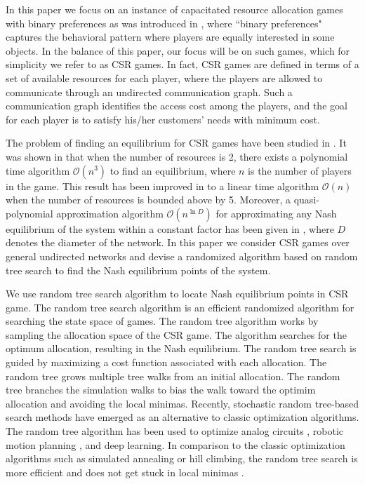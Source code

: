 In this paper we focus on an instance of capacitated resource allocation games with binary preferences as was introduced in \cite{gopalakrishnan2012cache}, where ``binary preferences" captures the behavioral pattern where players are equally interested in some objects. In the balance of this paper, our focus will be on such games, which for simplicity we refer to as CSR games. In fact, CSR games are defined in terms of a set of available resources for each player, where the players are allowed to communicate through an undirected communication graph. Such a communication graph identifies the access cost among the players, and the goal for each player is to satisfy his/her customers' needs with minimum cost.

The problem of finding an equilibrium for CSR games have been studied in \cite{gopalakrishnan2012cache,etesami2014pure}. It was shown in \cite{gopalakrishnan2012cache} that when the number of resources is 2, there exists a polynomial time algorithm $\mathcal{O}(n^3)$ to find an equilibrium, where $n$ is the number of players in the game. This result has been improved in \cite{etesami2014pure} to a linear time algorithm $\mathcal{O}(n)$ when the number of resources is bounded above by 5. Moreover, a quasi-polynomial approximation algorithm $\mathcal{O}(n^{\ln D})$ for approximating any Nash equilibrium of the system within a constant factor has been given in \cite{etesami2015approximation}, where $D$ denotes the diameter of the network. In this paper we consider CSR games over general undirected networks and devise a randomized algorithm based on random tree search to find the Nash equilibrium points of the system.

We use random tree search algorithm to locate Nash equilibrium points in CSR game. The random tree search algorithm is an efficient randomized algorithm for searching the state space of games. The random tree algorithm works by sampling the allocation space of the CSR game. The algorithm searches for the optimum allocation, resulting in the Nash equilibrium.
The random tree search is guided by maximizing a cost function associated with each allocation. The random tree grows multiple tree walks from an initial allocation. The random tree branches the simulation walks to bias the walk toward the optimim allocation and avoiding the local minimas.
Recently, stochastic random tree-based search methods have emerged as an alternative to classic optimization algorithms.  The random tree algorithm has been used to optimize analog circuits \cite{adel2015}, robotic motion planning \cite{Lavalle2006}, and deep learning\cite{silver2016}. In comparison to the classic optimization algorithms such as simulated annealing or hill climbing, the random tree search is more efficient and does not get stuck in local minimas \cite{adel15, Lavalle2006}.

